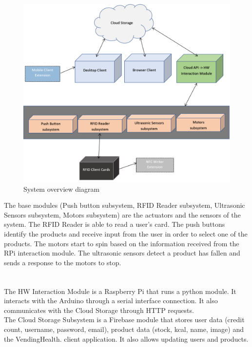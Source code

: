 \documentclass[a4paper,11pt]{article}
\begin{document}
\begin{figure}[h]
\centering
\includegraphics[scale=0.8]{SystemOverview.png}
\caption{System overview diagram}
\label{fig:system}
\end{figure}

The base modules (Push button subsystem, RFID Reader subsystem, Ultrasonic Sensors subsystem, Motors subsystem) are the actuators and the sensors of the system. The RFID Reader is able to read a user's card. The push buttons identify the products and receive input from the user in order to select one of the products. The motors start to spin based on the information received from the RPi interaction module. The ultrasonic sensors detect a product has fallen and sends a response to the motors to stop.\\\\\\

The HW Interaction Module is a Raspberry Pi that runs a python module. It interacts with the Arduino through a serial interface connection. It also communicates with the Cloud Storage through HTTP requests.\\ 

The Cloud Storage Subsystem is a Firebase module that stores user data (credit count, username, password, email), product data (stock, kcal, name, image) and the VendingHealth. client application. It also allows updating users and products.\\ 
\end{document}
